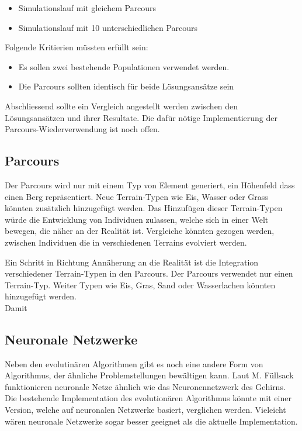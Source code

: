       \begin{itemize}
        \item Simulationslauf mit gleichem Parcours
        \item Simulationslauf mit 10 unterschiedlichen Parcours
      \end{itemize}

      Folgende Kritierien müssten erfüllt sein:

      \begin{itemize}
        \item Es sollen zwei bestehende Populationen verwendet werden.
        \item Die Parcours sollten identisch für beide Lösungsansätze sein
      \end{itemize}

      Abschliessend sollte ein Vergleich angestellt werden zwischen den Lösungsansätzen und ihrer Resultate.
      Die dafür nötige Implementierung der Parcours-Wiederverwendung ist noch offen.

    \subsection{Parcours}

      Der Parcours wird nur mit einem Typ von Element generiert, ein Höhenfeld dass einen Berg repräsentiert.
      Neue Terrain-Typen wie Eis, Wasser oder Grass könnten zusätzlich hinzugefügt werden.
      Das Hinzufügen dieser Terrain-Typen würde die Entwicklung von Individuen zulassen,
      welche sich in einer Welt bewegen, die näher an der Realität ist.
      Vergleiche könnten gezogen werden, zwischen Individuen die in verschiedenen Terrains evolviert werden.


      Ein Schritt in Richtung Annäherung an die Realität ist die Integration
      verschiedener Terrain-Typen in den Parcours. Der Parcours verwendet nur einen Terrain-Typ.
      Weiter Typen wie Eis, Gras, Sand oder Wasserlachen könnten hinzugefügt werden.
      \\
      Damit


    \subsection{Neuronale Netzwerke}

      Neben den evolutinären Algorithmen gibt es noch eine andere Form von Algorithmus,
      der ähnliche Problemstellungen bewältigen kann.
      Laut M. Füllsack~\cite{book:fullsack} funktionieren neuronale Netze ähnlich wie das Neuronennetzwerk des Gehirns.
      Die bestehende Implementation des evolutionären Algorithmus könnte mit einer Version,
      welche auf neuronalen Netzwerke basiert, verglichen werden.
      Vieleicht wären neuronale Netzwerke sogar besser geeignet als die aktuelle Implementation.
